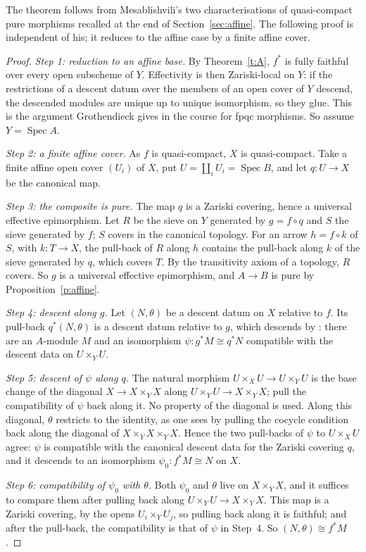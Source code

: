 \documentclass[11pt,a4paper]{amsart}
\theoremstyle{definition}
\theoremstyle{remark}
\newcommand{\Spec}{\operatorname{Spec}}
\begin{document}
The theorem follows from Mesablishvili's two characterisations of quasi-compact pure morphisms recalled at the end of Section~\ref{sec:affine}. The following proof is independent of his; it reduces to the affine case by a finite affine cover.

\begin{proof}
\emph{Step 1: reduction to an affine base.} By Theorem~\ref{t:A}, $f^*$ is fully faithful over every open subscheme of $Y$. Effectivity is then Zariski-local on $Y$: if the restrictions of a descent datum over the members of an open cover of $Y$ descend, the descended modules are unique up to unique isomorphism, so they glue. This is the argument Grothendieck gives in the course for fpqc morphisms. So assume $Y=\Spec A$.

\emph{Step 2: a finite affine cover.} As $f$ is quasi-compact, $X$ is quasi-compact. Take a finite affine open cover $(U_i)$ of $X$, put $U=\coprod_iU_i=\Spec B$, and let $q\colon U\to X$ be the canonical map.

\emph{Step 3: the composite is pure.} The map $q$ is a Zariski covering, hence a universal effective epimorphism. Let $R$ be the sieve on $Y$ generated by $g=f\circ q$ and $S$ the sieve generated by $f$; $S$ covers in the canonical topology. For an arrow $h=f\circ k$ of $S$, with $k\colon T\to X$, the pull-back of $R$ along $h$ contains the pull-back along $k$ of the sieve generated by $q$, which covers $T$. By the transitivity axiom of a topology, $R$ covers. So $g$ is a universal effective epimorphism, and $A\to B$ is pure by Proposition~\ref{p:affine}.

\emph{Step 4: descent along $g$.} Let $(N,\theta)$ be a descent datum on $X$ relative to $f$. Its pull-back $q^*(N,\theta)$ is a descent datum relative to $g$, which descends by \cite[08XA]{stacks}: there are an $A$-module $M$ and an isomorphism $\psi\colon g^*M\cong q^*N$ compatible with the descent data on $U\times_YU$.

\emph{Step 5: descent of $\psi$ along $q$.} The natural morphism $U\times_XU\to U\times_YU$ is the base change of the diagonal $X\to X\times_YX$ along $U\times_YU\to X\times_YX$; pull the compatibility of $\psi$ back along it. No property of the diagonal is used. Along this diagonal, $\theta$ restricts to the identity, as one sees by pulling the cocycle condition back along the diagonal of $X\times_YX\times_YX$. Hence the two pull-backs of $\psi$ to $U\times_XU$ agree: $\psi$ is compatible with the canonical descent data for the Zariski covering $q$, and it descends to an isomorphism $\psi_0\colon f^*M\cong N$ on $X$.

\emph{Step 6: compatibility of $\psi_0$ with $\theta$.} Both $\psi_0$ and $\theta$ live on $X\times_YX$, and it suffices to compare them after pulling back along $U\times_YU\to X\times_YX$. This map is a Zariski covering, by the opens $U_i\times_YU_j$, so pulling back along it is faithful; and after the pull-back, the compatibility is that of $\psi$ in Step~4. So $(N,\theta)\cong f^*M$.
\end{proof}
\end{document}
